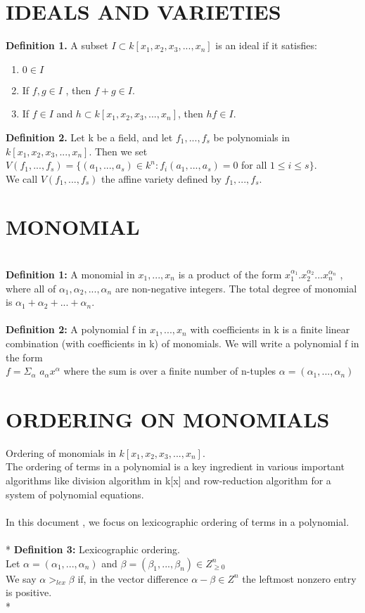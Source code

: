 \documentclass[12pt]{article}
\begin{document}
\section{IDEALS AND VARIETIES}
{\bf Definition 1.} A subset $I \subset k[x_{1} ,x_{2} ,x_{3},...,x_{n}]$ is an ideal if it satisfies: 
\begin{enumerate}
\item $0 \in I$
\item If $f, g \in I$ , then $f + g \in I$.
\item If $f \in I$ and $h \subset k[x_{1} ,x_{2} ,x_{3},...,x_{n}]$, then $hf \in I$.
\end{enumerate}
{\bf Definition 2.} Let k be a field, and let $f_{1} , . . . , f_{s}$ be polynomials in $k[x_{1} ,x_{2} ,x_{3},...,x_{n}]$. Then we set\\ 
    $V( f_{1} , . . . , f_{s} ) = \{(a_{1} , . . . , a_{s} ) \in k^{n} : f_{i} (a_{1} , . . . , a_{s} ) = 0$ for all $ 1 \leq i \leq s\}$. \\
We call $V(f_{1} , . . . , f_{s})$ the affine variety defined by $f_{1} , . . . , f_{s}$. 
\section{MONOMIAL}
\\
{ \bf Definition 1: }
A monomial in $x_{1}, . . . , x_{n}$ is a product of the form 
$x_{1}^{\alpha_{1}}.x_{2}^{\alpha_{2}}...x_{n}^{\alpha_{n}}$ , where all of $\alpha_{1}, \alpha_{2}, ...  ,\alpha_{n}$   are non-negative integers. The total degree of monomial is $\alpha_{1} + \alpha_{2} + ... + \alpha_{n}$.\\
\\
{ \bf Definition 2: }
A polynomial f in $x_{1}, ... ,x_{n}$ with coefficients in k is a finite linear 
combination (with coefficients in k) of monomials. We will write a polynomial f in the 
form \\
$f = \Sigma_{\alpha}$ $a_{\alpha}x^{\alpha}$ where the sum is over a finite number of n-tuples $\alpha = (\alpha_{1},...,\alpha_{n})$\\
\section{ORDERING ON MONOMIALS}
Ordering of monomials in $k[x_{1} ,x_{2} ,x_{3},...,x_{n}]$.
\\
The ordering of terms in a polynomial is a key ingredient in various important algorithms like division algorithm in  k[x]  and row-reduction algorithm for a system of  polynomial equations.
\\
\\
In this document , we focus on lexicographic ordering of terms in a polynomial.
\\
\\*
{ \bf Definition 3: }
Lexicographic ordering.
\\
Let $\alpha = (\alpha_{1},...,\alpha_{n})$ and $\beta = (\beta_{1},...,\beta_{n}) \in Z_{\geq 0}^{n}$
\\
We say $\alpha >_{lex} \beta$ if, in the vector difference $\alpha - \beta \in Z^{n}$
the leftmost nonzero entry is positive.
\\*
\end{document}
